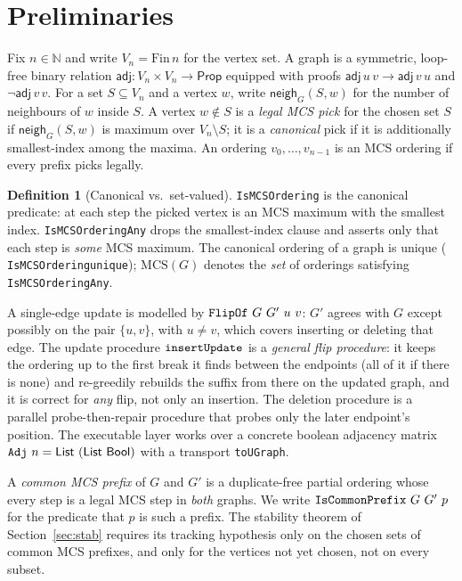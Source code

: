 \documentclass[11pt]{article}
\theoremstyle{definition}
\newtheorem{definition}[theorem]{Definition}
\theoremstyle{remark}
\newcommand{\leanname}[1]{%
  \texttt{\begingroup\def\_{\textunderscore\allowbreak}#1\endgroup}}
\newcommand{\mcso}{\mathrm{MCS}}
\newcommand{\Adj}{\mathsf{adj}}
\newcommand{\neigh}{\mathsf{neigh}}
\begin{document}
\section{Preliminaries}
\label{sec:prelim}

Fix $n\in\mathbb N$ and write $V_n=\mathrm{Fin}\,n$ for the vertex set. A graph
is a symmetric, loop-free binary relation $\Adj\colon V_n\times V_n\to\mathsf{Prop}$
equipped with proofs $\Adj\,u\,v\to\Adj\,v\,u$ and $\lnot\Adj\,v\,v$. For a set
$S\subseteq V_n$ and a vertex $w$, write $\neigh_G(S,w)$ for the number of
neighbours of $w$ inside $S$. A vertex $w\notin S$ is a \emph{legal MCS pick} for
the chosen set $S$ if $\neigh_G(S,w)$ is maximum over $V_n\setminus S$; it is a
\emph{canonical} pick if it is additionally smallest-index among the maxima. An
ordering $v_0,\dots,v_{n-1}$ is an MCS ordering if every prefix picks legally.

\begin{definition}[Canonical vs.\ set-valued]
\leanname{IsMCSOrdering} is the canonical predicate: at each step the picked
vertex is an MCS maximum with the smallest index. \leanname{IsMCSOrderingAny}
drops the smallest-index clause and asserts only that each step is
\emph{some} MCS maximum. The canonical ordering of a graph is unique
(\leanname{IsMCSOrdering\_unique}); $\mcso(G)$ denotes the \emph{set} of
orderings satisfying \leanname{IsMCSOrderingAny}.
\end{definition}

A single-edge update is modelled by $\leanname{FlipOf}\ G\ G'\ u\ v$: $G'$
agrees with $G$ except possibly on the pair $\{u,v\}$, with $u\neq v$, which
covers inserting or deleting that edge. The update procedure
$\leanname{insertUpdate}$ is a \emph{general flip procedure}: it keeps the
ordering up to the first break it finds between the endpoints (all of it if
there is none) and re-greedily rebuilds the suffix from there on the updated
graph, and it is correct for \emph{any} flip, not only an insertion. The deletion procedure is a
parallel probe-then-repair procedure that probes only the later endpoint's
position. The executable layer works over a concrete
boolean adjacency matrix $\leanname{Adj}\ n = \mathsf{List}\ (\mathsf{List}\
\mathsf{Bool})$ with a transport \leanname{toUGraph}.

A \emph{common MCS prefix} of $G$ and $G'$ is a duplicate-free partial ordering
whose every step is a legal MCS step in \emph{both} graphs. We write
$\leanname{IsCommonPrefix}\ G\ G'\ p$ for the predicate that $p$ is such a
prefix. The stability theorem of Section~\ref{sec:stab} requires its tracking
hypothesis only on the chosen sets of common MCS prefixes, and only for the
vertices not yet chosen, not on every subset.
\end{document}
